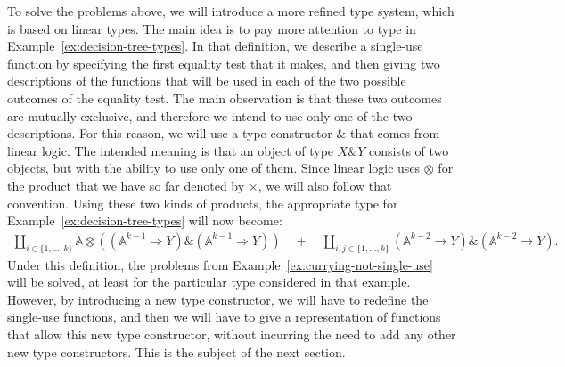 \documentclass[10pt,a4paper]{amsart}
\numberwithin{equation}{section}
\theoremstyle{plain}
\newcommand{\set}[1]{\{#1\}}
\newcommand{\atoms}{\mathbb A}
\begin{document}
To solve the problems above, we will introduce a more refined type system, which is based on linear types.  The main idea is to pay more attention to type  in Example~\ref{ex:decision-tree-types}. In that definition, we describe a single-use function by specifying the first equality test that it makes, and then giving two descriptions of the functions that will be used in each of the two possible outcomes of the equality test. The main observation is that these two outcomes are mutually exclusive, and therefore we intend to use only one of the two descriptions. For this reason, we will use a  type constructor $\&$ that comes from linear logic. The intended meaning is  that an object of type $X \& Y$ consists of two objects, but with the ability to use only one of them. Since linear logic uses $\otimes$  for the  product that we have so far denoted by $\times$, we will also follow that convention. Using these two kinds of products, the appropriate type for Example~\ref{ex:decision-tree-types} will now become:
\begin{align*}
\coprod_{i \in \set{1,\ldots,k}} 
        \atoms \otimes ((\atoms^{k-1} \Rightarrow Y) \& (\atoms^{k-1} \Rightarrow Y))
          \quad + \quad 
    \coprod_{i, j \in \set{1,\ldots,k}} (\atoms^{k-2} \to Y) \& (\atoms^{k-2} \to Y).
    \end{align*}
Under this definition, the problems from Example~\ref{ex:currying-not-single-use} will be solved, at least for the particular type considered in that example. However, by introducing a new type constructor, we will have to redefine the single-use functions, and then we will have to give a representation of functions that allow this new type constructor, without incurring the need to add any other new type constructors. This is the subject of the next section.
\end{document}
